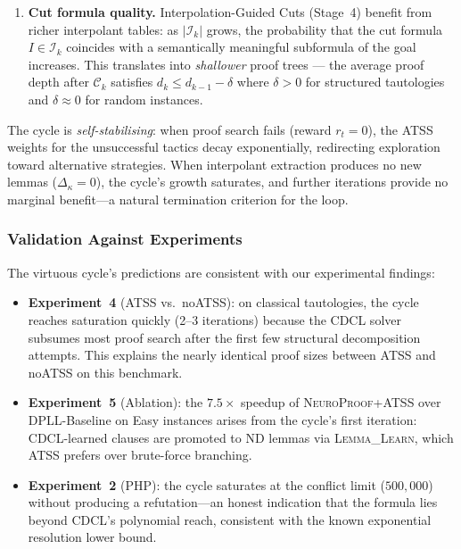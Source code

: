 \documentclass[conference]{IEEEtran}
\newcommand{\NP}{\textsc{NeuroProof}}
\newcommand{\ATSS}{\textsc{ATSS}}
\begin{document}
\begin{enumerate}
  \item \textbf{Cut formula quality.}
    Interpolation-Guided Cuts (Stage~4) benefit from richer
    interpolant tables: as $|\mathcal{I}_k|$ grows, the probability
    that the cut formula $I \in \mathcal{I}_k$ coincides with a
    semantically meaningful subformula of the goal increases.  This
    translates into \emph{shallower} proof trees --- the average
    proof depth after $\mathcal{C}_k$ satisfies
    $d_k \le d_{k-1} - \delta$ where $\delta > 0$ for structured
    tautologies and $\delta \approx 0$ for random instances.
\end{enumerate}

The cycle is \emph{self-stabilising}: when proof search fails
(reward $r_t = 0$), the ATSS weights for the unsuccessful tactics
decay exponentially, redirecting exploration toward alternative
strategies.  When interpolant extraction produces no new lemmas
($\Delta_\kappa = 0$), the cycle's growth saturates, and further
iterations provide no marginal benefit---a natural termination
criterion for the loop.

\subsubsection*{Validation Against Experiments}

The virtuous cycle's predictions are consistent with our
experimental findings:

\begin{itemize}
  \item \textbf{Experiment~4} (ATSS vs.\ noATSS):
    on classical tautologies, the cycle reaches saturation
    quickly (2--3 iterations) because the CDCL solver subsumes
    most proof search after the first few structural
    decomposition attempts.  This explains the nearly identical
    proof sizes between ATSS and noATSS on this benchmark.
  \item \textbf{Experiment~5} (Ablation):
    the $7.5\times$ speedup of \NP{}+\ATSS{} over DPLL-Baseline
    on Easy instances arises from the cycle's first iteration:
    CDCL-learned clauses are promoted to ND lemmas via
    \textsc{Lemma\_Learn}, which ATSS prefers over
    brute-force branching.
  \item \textbf{Experiment~2} (PHP):
    the cycle saturates at the conflict limit ($500{,}000$)
    without producing a refutation---an honest indication that
    the formula lies beyond CDCL's polynomial reach, consistent
    with the known exponential resolution lower bound.
\end{itemize}
\end{document}
